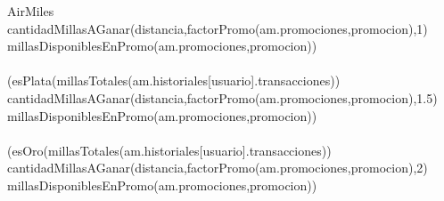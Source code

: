 \documentclass[11pt,a4paper]{article}
\begin{document}
\begin{tad}{AirMiles}
{                cantidadMillasAGanar(distancia,factorPromo(am.promociones,promocion),1) \leq \\ millasDisponiblesEnPromo(am.promociones,promocion))  \\ \land \\
                (esPlata(millasTotales(am.historiales[usuario].transacciones)) \implies \\
                cantidadMillasAGanar(distancia,factorPromo(am.promociones,promocion),1.5) \leq \\ millasDisponiblesEnPromo(am.promociones,promocion)) \\ \land \\
                (esOro(millasTotales(am.historiales[usuario].transacciones)) \implies \\
                cantidadMillasAGanar(distancia,factorPromo(am.promociones,promocion),2) \leq \\ millasDisponiblesEnPromo(am.promociones,promocion))}
\\
\\
\\
\\


\end{tad}
\end{document}
